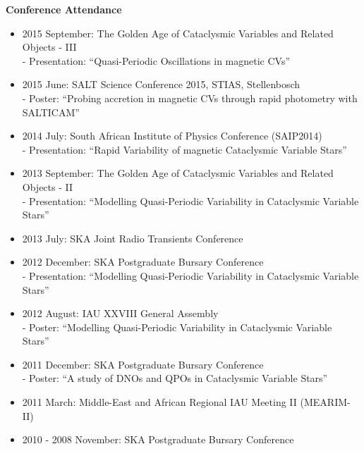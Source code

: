 \documentclass{article}
\begin{document}
\large\textbf{Conference Attendance}
\vspace{0.2cm}
\normalsize
\begin{itemize}
 \item 2015 September: The Golden Age of Cataclysmic Variables and Related Objects - III\\
 \hspace*{0.4cm} - Presentation: ``Quasi-Periodic Oscillations in magnetic CVs''
 \item 2015 June: SALT Science Conference 2015, STIAS, Stellenbosch \\
 \hspace*{0.4cm} - Poster: ``Probing accretion in magnetic CVs through rapid photometry with SALTICAM''
 \item 2014 July: South African Institute of Physics Conference (SAIP2014)\\
 \hspace*{0.4cm} - Presentation: ``Rapid Variability of magnetic Cataclysmic Variable Stars''
 \item 2013 September: The Golden Age of Cataclysmic Variables and Related Objects - II\\
 \hspace*{0.4cm} - Presentation: ``Modelling Quasi-Periodic Variability in Cataclysmic Variable Stars''
 \item 2013 July: SKA Joint Radio Transients Conference\\
 \hspace*{0.4cm}
 \item 2012 December: SKA Postgraduate Bursary Conference\\
 \hspace*{0.4cm} - Presentation: ``Modelling Quasi-Periodic Variability in Cataclysmic Variable Stars''
 \item 2012 August: IAU XXVIII General Assembly\\
 \hspace*{0.4cm} - Poster: ``Modelling Quasi-Periodic Variability in Cataclysmic Variable Stars''
 \item 2011 December: SKA Postgraduate Bursary Conference\\
 \hspace*{0.4cm} - Poster: ``A study of DNOs and QPOs in Cataclysmic Variable Stars''
 \item 2011 March: Middle-East and African Regional IAU Meeting II (MEARIM-II)
 \item 2010 - 2008 November: SKA Postgraduate Bursary Conference
\end{itemize}
\end{document}
